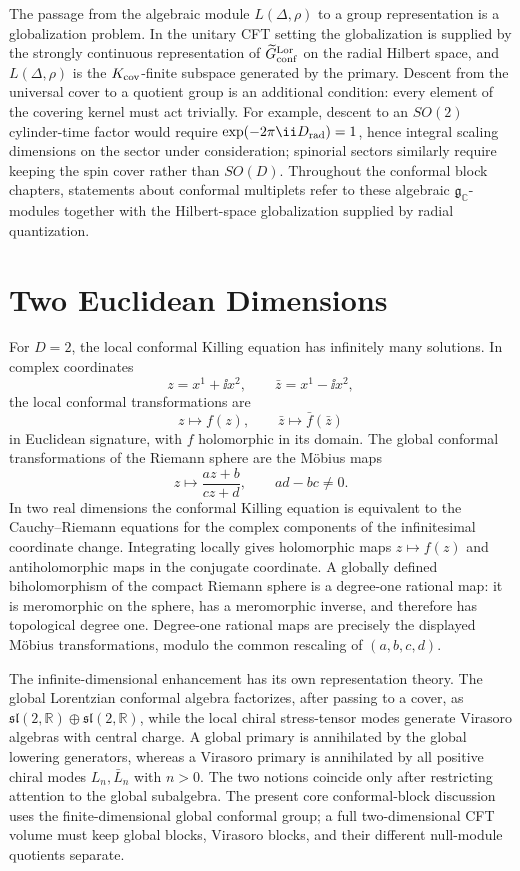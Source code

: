 The passage from the algebraic module \(L(\Delta,\rho)\) to a group
representation is a globalization problem.  In the unitary CFT setting the
globalization is supplied by the strongly continuous representation of
\(\widetilde G_{\rm conf}^{\rm Lor}\) on the radial Hilbert space, and
\(L(\Delta,\rho)\) is the \(K_{\rm cov}\)-finite subspace generated by the
primary.  Descent from the universal cover to a quotient group is an additional
condition: every element of the covering kernel must act trivially.  For
example, descent to an \(SO(2)\) cylinder-time factor would require
\(\exp(-2\pi\ii D_{\rm rad})=1\), hence integral scaling dimensions on the
sector under consideration; spinorial sectors similarly require keeping the
spin cover rather than \(SO(D)\).  Throughout the conformal block chapters,
statements about conformal multiplets refer to these algebraic
\(\mathfrak g_\mathbb C\)-modules together with the Hilbert-space
globalization supplied by radial quantization.

\section{Two Euclidean Dimensions}

For \(D=2\), the local conformal Killing equation has infinitely many
solutions.  In complex coordinates
\[
  z=x^1+\ii x^2,\qquad
  \bar z=x^1-\ii x^2,
\]
the local conformal transformations are
\[
  z\mapsto f(z),\qquad
  \bar z\mapsto \bar f(\bar z)
\]
in Euclidean signature, with \(f\) holomorphic in its domain.  The global
conformal transformations of the Riemann sphere are the Möbius maps
\[
  z\mapsto \frac{az+b}{cz+d},
  \qquad
  ad-bc\neq0.
\]
In two real dimensions the conformal Killing equation is equivalent to the
Cauchy--Riemann equations for the complex components of the infinitesimal
coordinate change.  Integrating locally gives holomorphic maps
\(z\mapsto f(z)\) and antiholomorphic maps in the conjugate coordinate.  A
globally defined biholomorphism of the compact Riemann sphere is a degree-one
rational map: it is meromorphic on the sphere, has a meromorphic inverse, and
therefore has topological degree one.  Degree-one rational maps are precisely
the displayed Möbius transformations, modulo the common rescaling of
\((a,b,c,d)\).

The infinite-dimensional enhancement has its own representation theory.  The
global Lorentzian conformal algebra factorizes, after passing to a cover, as
\(\mathfrak{sl}(2,\mathbb R)\oplus\mathfrak{sl}(2,\mathbb R)\), while the
local chiral stress-tensor modes generate Virasoro algebras with central
charge.  A global primary is annihilated by the global lowering generators,
whereas a Virasoro primary is annihilated by all positive chiral modes
\(L_n,\bar L_n\) with \(n>0\).  The two notions coincide only after restricting
attention to the global subalgebra.  The present core conformal-block
discussion uses the finite-dimensional global conformal group; a full
two-dimensional CFT volume must keep global blocks, Virasoro blocks, and their
different null-module quotients separate.
